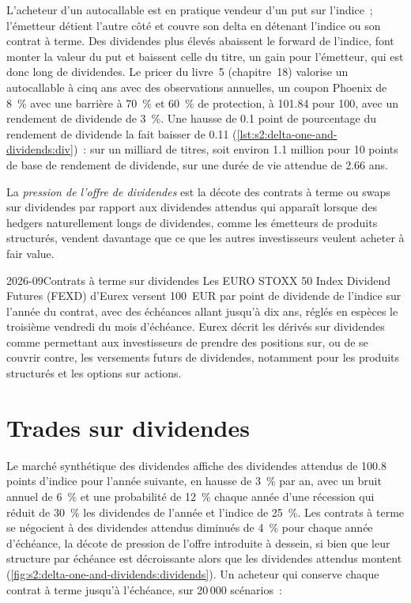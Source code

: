 L'acheteur d'un autocallable est en pratique vendeur d'un put sur l'indice~; l'émetteur détient l'autre côté et couvre son delta en détenant l'indice ou son
contrat à terme. Des dividendes plus élevés abaissent le forward de l'indice, font monter la valeur du put et baissent celle du titre, un gain pour l'émetteur, qui est donc long
de dividendes. Le pricer du livre~5 (chapitre~18) valorise un autocallable à cinq ans avec des observations annuelles, un coupon Phoenix de 8~\% avec une barrière à 70~\% et 60~\%
de protection, à 101.84 pour 100, avec un rendement de dividende de 3~\%. Une hausse de 0.1 point de pourcentage du rendement de dividende la fait baisser de 0.11
(\cref{lst:s2:delta-one-and-dividends:div})~: sur un milliard de titres, soit environ 1.1 million pour 10 points de base de rendement de dividende, sur une durée de vie attendue de
2.66 ans.

\begin{definition}\label{def:s2:delta-one-and-dividends:supply}
La \emph{pression de l'offre de dividendes} est la décote des contrats à terme ou swaps sur dividendes par rapport aux dividendes attendus qui apparaît lorsque
des hedgers naturellement longs de dividendes, comme les émetteurs de produits structurés, vendent davantage que ce que les autres investisseurs veulent acheter à fair value.
\end{definition}

\begin{dated}{2026-09}{Contrats à terme sur dividendes}\label{dat:s2:delta-one-and-dividends:fexd}
Les EURO STOXX 50 Index Dividend Futures (FEXD) d'Eurex versent 100~EUR par point de dividende de l'indice sur l'année du contrat, avec des échéances allant jusqu'à dix
ans, réglés en espèces le troisième vendredi du mois d'échéance. Eurex décrit les dérivés sur dividendes comme permettant aux investisseurs de prendre des positions sur, ou de se couvrir contre,
les versements futurs de dividendes, notamment pour les produits structurés et les options sur actions.
\end{dated}

\section{Trades sur dividendes}

Le marché synthétique des dividendes affiche des dividendes attendus de 100.8 points d'indice pour l'année suivante, en hausse de 3~\% par an, avec un bruit annuel de 6~\% et une probabilité de 12~\%
chaque année d'une récession qui réduit de 30~\% les dividendes de l'année et l'indice de 25~\%. Les contrats à terme se négocient à des dividendes attendus diminués de 4~\% pour chaque année
d'échéance, la décote de pression de l'offre introduite à dessein, si bien que leur structure par échéance est décroissante alors que les dividendes attendus montent
(\cref{fig:s2:delta-one-and-dividends:dividends}). Un acheteur qui conserve chaque contrat à terme jusqu'à l'échéance, sur 20\,000 scénarios~:

